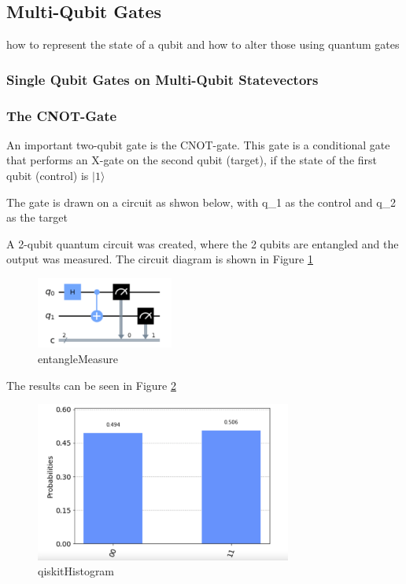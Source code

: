\subsection{Multi-Qubit Gates}

how to represent the state of a qubit and how to alter those using quantum gates

\subsubsection{Single Qubit Gates on Multi-Qubit Statevectors}

\subsubsection{The CNOT-Gate}
An important two-qubit gate is the CNOT-gate. This gate is a conditional gate that performs an X-gate on the second qubit (target), if the state of the first qubit (control) is  $|1\rangle$

The gate is drawn on a circuit as shwon below, with q\_1 as the control and q\_2 as the target

A 2-qubit quantum circuit was created, where the 2 qubits are entangled and the output was measured. The circuit diagram is shown in Figure \ref{fig:entangleMeasure}

\begin{figure}[h]
    \centering
    \includegraphics[width=0.4\textwidth]{lab2/entangleMeasure.png}
    \caption{entangleMeasure} 
    \label{fig:entangleMeasure}
\end{figure}

The results can be seen in Figure \ref{fig:qiskitHistogram}

\begin{figure}[h]
    \centering
    \includegraphics[width=0.75\textwidth]{lab2/qiskitHistogram.png}
    \caption{qiskitHistogram} 
    \label{fig:qiskitHistogram}
\end{figure} 

